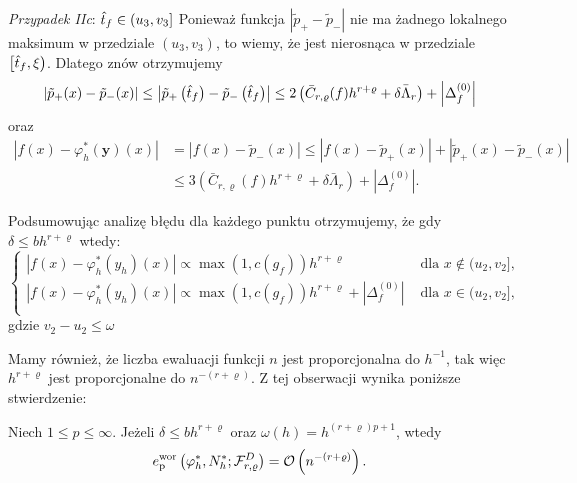 \documentclass[oik, pdftex, robocza, man]{mgrwms}
\begin{document}
    \textit{Przypadek IIc}: $\hat{t}_{f} \in\left(u_{3}, v_{3}\right]$
    Ponieważ funkcja $\left|\tilde{p}_{+}-\tilde{p}_{-}\right|$ nie ma żadnego lokalnego maksimum w przedziale $\left(u_{3}, v_{3}\right)$, to wiemy, że jest nierosnąca w przedziale $\left[\hat{t}_{f}, \xi\right)$. Dlatego znów otrzymujemy
    \begin{equation*}
        \left|\tilde{p}_{+}(x)-\tilde{p}_{-}(x)\right| \leq\left|\tilde{p}_{+}\left(\hat{t}_{f}\right)-\tilde{p}_{-}\left(\hat{t}_{f}\right)\right| \leq 2\left(\bar{C}_{r, \varrho}(f) h^{r+\varrho}+\delta \bar{\Lambda}_{r}\right)+\left|\Delta_{f}^{(0)}\right|
    \end{equation*}
    oraz
    \begin{equation*}
        \begin{aligned}
            \left|f(x)-\varphi_{h}^{*}(\mathbf{y})(x)\right| &=\left|f(x)-\tilde{p}_{-}(x)\right| \leq\left|f(x)-\tilde{p}_{+}(x)\right|+\left|\tilde{p}_{+}(x)-\tilde{p}_{-}(x)\right| \\
            & \leq 3\left(\bar{C}_{r, \varrho}(f) h^{r+\varrho}+\delta \bar{\Lambda}_{r}\right)+\left|\Delta_{f}^{(0)}\right|.
        \end{aligned}
    \end{equation*}

    Podsumowując analizę błędu dla każdego punktu otrzymujemy, że gdy $\delta \leq bh^{r+\varrho}$ wtedy:
    \begin{equation*}
        \begin{cases}
            |f(x) - \varphi_{h}^{*}(y_{h})(x)| \propto \max(1, c(g_{f})) h^{r+\varrho} & \text{ dla } x \notin (u_{2}, v_{2}], \\
            |f(x) - \varphi_{h}^{*}(y_{h})(x)| \propto \max(1, c(g_{f})) h^{r+\varrho} + |\Delta_{f}^{(0)}| & \text{ dla } x \in (u_{2}, v_{2}], \\
        \end{cases}
    \end{equation*}
    gdzie $v_{2} - u_{2} \leq \omega$

    Mamy również, że liczba ewaluacji funkcji $n$ jest proporcjonalna do $h^{-1}$, tak więc $h^{r+\varrho}$ jest proporcjonalne do $n^{-(r+\varrho)}$. Z tej obserwacji wynika poniższe stwierdzenie:
    \begin{stw}
        \label{stw2}
        Niech $1 \leq p \leq \infty$. Jeżeli $\delta \leq bh^{r+\varrho}$ oraz $\omega(h) = h^{(r+\varrho)p + 1}$, wtedy
        \begin{equation*}
            e_{\mathrm{p}}^{\mathrm{wor}}\left(\varphi_{h}^{*}, N_{h}^{*} ; \mathcal{F}_{r, \varrho}^{D}\right)=\mathcal{O}\left(n^{-(r+\varrho)}\right).
        \end{equation*}
    \end{stw}
\end{document}
